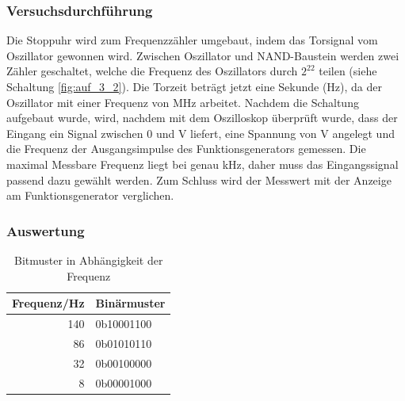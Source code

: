 \documentclass[12pt,a4paper]{article}
\begin{document}
\subsubsection*{Versuchsdurchführung}
Die Stoppuhr wird zum Frequenzzähler umgebaut, indem das Torsignal vom Oszillator gewonnen wird. Zwischen Oszillator und NAND-Baustein werden zwei Zähler geschaltet, welche die Frequenz des Oszillators durch $2^{22}$ teilen (siehe Schaltung \ref{fig:auf_3_2}). Die Torzeit beträgt jetzt eine Sekunde (\unit[0,5]{Hz}), da der Oszillator mit einer Frequenz von \unit[2,09715]{MHz} arbeitet. Nachdem die Schaltung aufgebaut wurde, wird, nachdem mit dem Oszilloskop überprüft wurde, dass der Eingang ein Signal zwischen 0 und \unit[5]{V} liefert, eine Spannung von \unit[5]{V} angelegt und die Frequenz der Ausgangsimpulse des Funktionsgenerators gemessen. Die maximal Messbare Frequenz liegt bei genau \unit[4,096]{kHz}, daher muss das Eingangssignal passend dazu gewählt werden. Zum Schluss wird der Messwert mit der Anzeige am Funktionsgenerator verglichen.
\subsubsection*{Auswertung}

\begin{table}[htbp]
\begin{center}
\begin{tabular}{|r|l|}
\hline
\multicolumn{1}{|l|}{Frequenz/Hz} & Binärmuster \\ \hline \hline
140 & 0b10001100 \\ \hline
86 & 0b01010110 \\ \hline
32 & 0b00100000 \\ \hline
8 & 0b00001000 \\ \hline
\end{tabular}
\end{center}
\caption{Bitmuster in Abhängigkeit der Frequenz}
\label{tab:frequ}
\end{table}
\end{document}
